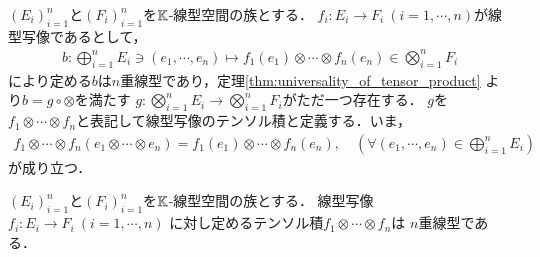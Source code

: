 	\begin{screen}
		\begin{dfn}[線型写像のテンソル積]
				$(E_i)_{i=1}^n$と$(F_i)_{i=1}^n$を$\mathbb{K}$-線型空間の族とする．
				$f_i:E_i \longrightarrow F_i\ (i=1,\cdots,n)$が線型写像であるとして，
				\begin{align}
					b: \bigoplus_{i=1}^n E_i \ni (e_1,\cdots,e_n)
					\longmapsto f_1(e_1)\otimes \cdots \otimes f_n(e_n)
					\in \bigotimes_{i=1}^n F_i
				\end{align}
				により定める$b$は$n$重線型であり，定理\ref{thm:universality_of_tensor_product}
				より$b = g \circ \otimes$を満たす
				$g:\bigotimes_{i=1}^{n} E_i \longrightarrow \bigotimes_{i=1}^{n} F_i$がただ一つ存在する．
				$g$を$f_1 \otimes \cdots \otimes f_n$と表記して線型写像のテンソル積と定義する．いま，
				\begin{align}
					f_1 \otimes \cdots \otimes f_n(e_1 \otimes \cdots \otimes e_n)
					= f_1(e_1)\otimes \cdots \otimes f_n(e_n),
					\quad (\forall (e_1,\cdots,e_n) \in \bigoplus_{i=1}^n E_i)
				\end{align}
				が成り立つ．
		\end{dfn}
	\end{screen}
	
	\begin{screen}
		\begin{thm}[写像のテンソル積の多重線型性]
			$(E_i)_{i=1}^n$と$(F_i)_{i=1}^n$を$\mathbb{K}$-線型空間の族とする．
			線型写像$f_i:E_i \longrightarrow F_i\ (i=1,\cdots,n)$
			に対し定めるテンソル積$f_1 \otimes \cdots \otimes f_n$は
			$n$重線型である．
		\end{thm}
	\end{screen}